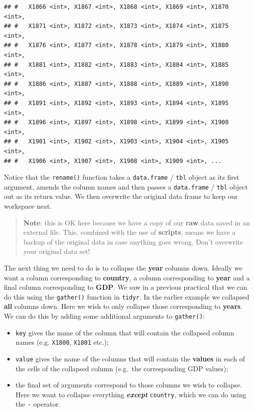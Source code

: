 \documentclass[]{book}
\providecommand{\tightlist}{%
  \setlength{\itemsep}{0pt}\setlength{\parskip}{0pt}}
\theoremstyle{definition}
\theoremstyle{definition}
\theoremstyle{definition}
\theoremstyle{remark}
\begin{document}
\begin{verbatim}
## #   X1866 <int>, X1867 <int>, X1868 <int>, X1869 <int>, X1870 <int>,
## #   X1871 <int>, X1872 <int>, X1873 <int>, X1874 <int>, X1875 <int>,
## #   X1876 <int>, X1877 <int>, X1878 <int>, X1879 <int>, X1880 <int>,
## #   X1881 <int>, X1882 <int>, X1883 <int>, X1884 <int>, X1885 <int>,
## #   X1886 <int>, X1887 <int>, X1888 <int>, X1889 <int>, X1890 <int>,
## #   X1891 <int>, X1892 <int>, X1893 <int>, X1894 <int>, X1895 <int>,
## #   X1896 <int>, X1897 <int>, X1898 <int>, X1899 <int>, X1900 <int>,
## #   X1901 <int>, X1902 <int>, X1903 <int>, X1904 <int>, X1905 <int>,
## #   X1906 <int>, X1907 <int>, X1908 <int>, X1909 <int>, ...
\end{verbatim}

Notice that the \texttt{rename()} function takes a \texttt{data.frame} /
\texttt{tbl} object as its first argument, amends the column names and
then passes a \texttt{data.frame} / \texttt{tbl} object out as its
return value. We then overwrite the original data frame to keep our
workspace neat.

\begin{quote}
\textbf{Note}: this is OK here because we have a copy of our
\textbf{raw} data saved in an external file. This, combined with the use
of \textbf{scripts}, means we have a backup of the original data in case
anything goes wrong. Don't overwrite your original data set!
\end{quote}

The next thing we need to do is to collapse the \textbf{year} columns
down. Ideally we want a column corresponding to \textbf{country}, a
column corresponding to \textbf{year} and a final column corresponding
to \textbf{GDP}. We saw in a previous practical that we can do this
using the \texttt{gather()} function in \texttt{tidyr}. In the earlier
example we collapsed \textbf{all} columns down. Here we wish to only
collapse those corresponding to \textbf{years}. We can do this by adding
some additional arguments to \texttt{gather()}:

\begin{itemize}
\tightlist
\item
  \texttt{key} gives the name of the column that will contain the
  collapsed column names (e.g. \texttt{X1800}, \texttt{X1801} etc.);
\item
  \texttt{value} gives the name of the columns that will contain the
  \textbf{values} in each of the cells of the collapsed column (e.g.~the
  corresponding GDP values);
\item
  the final set of arguments correspond to those columns we wish to
  collapse. Here we want to collapse everything \textbf{\emph{except}}
  \texttt{country}, which we can do using the \texttt{-} operator.
\end{itemize}
\end{document}
